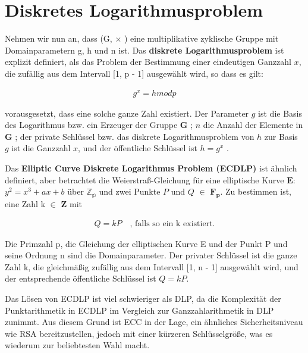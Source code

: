 \section{Diskretes Logarithmusproblem }

Nehmen wir nun an, dass (G, $ \times $ ) eine multiplikative zyklische Gruppe mit Domainparametern g, h und n ist. 
Das \textbf{diskrete Logarithmusproblem} ist explizit definiert, als das Problem der Bestimmung einer eindeutigen Ganzzahl $ x $, die zufällig aus dem Intervall [1, p - 1] ausgewählt wird, so dass es gilt:

\begin{ceqn}

\begin{align*}
    g^x = h mod p
\end{align*}

\end{ceqn}
vorausgesetzt, dass eine solche ganze Zahl existiert.
Der Parameter $ g $ ist die Basis des Logarithmus bzw. ein Erzeuger der Gruppe $ \mathbf{G} $ ; $ n $ die Anzahl der Elemente in $ \mathbf{G} $ ; der private Schlüssel bzw. das diskrete Logarithmusproblem von $ h $ zur Basis $ g $  ist die Ganzzahl $ x $, und der öffentliche Schlüssel ist   $ h = g^x $ \cite{Hankerson}.


Das \textbf{Elliptic Curve Diskrete Logarithmus Problem (ECDLP)} ist ähnlich definiert, aber betrachtet die Weierstraß-Gleichung für eine elliptische Kurve $ \mathbf{E:} $ $ y^2 = x^3 + ax + b $ über $ \mathbb{Z_p} $ und zwei Punkte $ P $ und $ Q $ $\in $ $ \mathbf{F_p} $.  Zu bestimmen ist, eine Zahl k $ \in $ $ \mathbf{Z} $ mit

\begin{ceqn}
\begin{align*}
      Q = kP  \quad \text{, falls so ein k existiert.}
\end{align*}
   
\end{ceqn}

Die Primzahl p, die Gleichung der elliptischen Kurve E und der Punkt P und seine Ordnung n sind die Domainparameter. Der privater Schlüssel ist die ganze Zahl k, die gleichmäßig zufällig aus dem Intervall [1, n - 1] ausgewählt wird, und der entsprechende öffentliche Schlüssel ist $ Q = kP $.


Das Lösen von ECDLP ist viel schwieriger als DLP, da die Komplexität der Punktarithmetik in ECDLP im Vergleich zur Ganzzahlarithmetik in DLP zunimmt. 
Aus diesem Grund ist ECC in der Lage, ein ähnliches Sicherheitsniveau wie RSA bereitzustellen, jedoch mit einer kürzeren Schlüsselgröße, was es wiederum zur beliebtesten Wahl macht\cite{mo2014}. 

